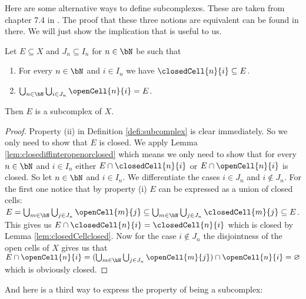 Here are some alternative ways to define subcomplexes. 
These are taken from chapter 7.4 in \cite{Jänich2001}.
The proof that these three notions are equivalent can be found in there. 
We will just show the implication that is useful to us. 

\begin{lem} \label{lem:subcomplex2}
    Let $E \subseteq X$ and $J_n \subseteq I_n$ for $n \in \bN$ be such that 
    \begin{enumerate}
        \item For every $n \in \bN$ and $i \in I_n$ we have $\closedCell{n}{i} \subseteq E$. 
        \item $\bigcup_{n \in \bN} \bigcup_{i \in J_n} \openCell{n}{i} = E$.
    \end{enumerate}
    Then $E$ is a subcomplex of $X$.
    \href{https://github.com/scholzhannah/CWComplexes/blob/7be4872a05b534011cc969eb5b80a4b7f0bf57e2/CWcomplexes/subcomplex.lean#L82-L89}{\faExternalLink}
\end{lem}
\begin{proof}
    Property (ii) in Definition \ref{defi:subcomplex} is clear immediately. 
    So we only need to show that $E$ is closed. 
    We apply Lemma \ref{lem:closediffinteropenorclosed} which means we only need to show that for every $n \in \bN$ and $i \in I_n$ either $E \cap \closedCell{n}{i}$ or $E \cap \openCell{n}{i}$ is closed. 
    So let $n \in \bN$ and $i \in I_n$. 
    We differentiate the cases $i \in J_n$ and $i \notin J_n$.
    For the first one notice that by property (i) $E$ can be expressed as a union of closed cells: $E = \bigcup_{m \in \bN} \bigcup_{j \in J_n} \openCell{m}{j} \subseteq \bigcup_{m \in \bN} \bigcup_{j \in J_n} \closedCell{m}{j} \subseteq E$. 
    This gives us $E \cap \closedCell{n}{i} = \closedCell{n}{i}$ which is closed by Lemma \ref{lem:closedCellclosed}. 
    Now for the case $i \notin J_n$ the disjointness of the open cells of $X$ gives us that $E \cap \openCell{n}{i} = (\bigcup_{m \in \bN} \bigcup_{j \in J_n} \openCell{m}{j}) \cap \openCell{n}{i} = \varnothing$ which is obviously closed. 
\end{proof}

And here is a third way to express the property of being a subcomplex:

